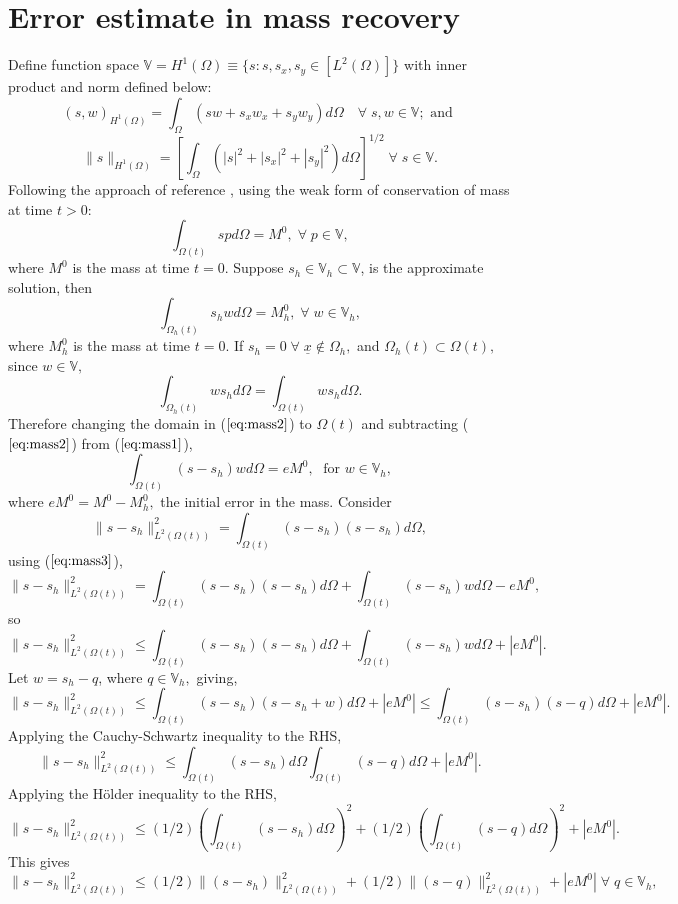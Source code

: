 \documentclass[11pt]{article}
\newcommand{\ul}{\underline}
\newcommand{\bigv}{\mathbb{V}}
\newcommand{\Om}{\Omega}
\begin{document}
\section{Error estimate in mass recovery}
Define function space $ \bigv = H^1(\Om)\equiv\{s: s, s_x, s_y \in [{L}^2(\Omega)]\}$ with inner product and norm defined below:
$$(s,w)_{H^{1}(\Om)} = \int_{\Om}(sw+ s_xw_x + s_yw_y )d\Om\quad \forall \; s, w \in\bigv; \text{ and }$$
$$ \|s\|_{H^1(\Om)} =\left[ \int_{\Om} (|s|^2 + |s_x|^2 +|s_y|^2 )d\Om\right]^{1/2}\; \forall \; s\in\bigv.$$
Following the approach of reference \cite{Baines2011}, using the weak form of conservation of mass at time $t>0$:
\begin{equation}
\label{eq:mass1}
\int_{\Om(t)}spd{\Om} = M^0, \; \forall \;p\in\bigv, 
\end{equation}
where $M^0$ is the mass at time $t=0$.
Suppose $s_h \in\bigv_h \subset \bigv$, is the approximate solution, then
\begin{equation}
\label{eq:mass2}
\int_{\Om_h(t)}s_hwd{\Om} = M_h^0, \; \forall \; w\in\bigv_h, 
\end{equation}
where $M_h^0$ is the mass at time $t=0$.
If $s_h = 0 \; \forall \; \ul{x} \notin \Om_h,$ and $\Om_h(t) \subset \Om(t),$ since $w \in \bigv,$
$$\int_{\Om_h(t)}ws_h d\Om = \int_{\Om(t) }ws_hd\Om.$$
Therefore changing the domain in ($\ref{eq:mass2}$) to $\Om(t) $ and subtracting ($\ref{eq:mass2}$) from ($\ref{eq:mass1}$),
\begin{equation}
\label{eq:mass3}
\int_{\Om(t)}(s-s_h)wd{\Om} = eM^0, \; \text{ for } w\in\bigv_h, 
\end{equation}
where $eM^0 = M^0 - M_h^0,$ the initial error in the mass.
Consider
$$\|s-s_h\|_{L^2(\Om(t))}^2 = \int_{\Om(t)}(s-s_h)(s-s_h)d\Om,$$
using ($\ref{eq:mass3}$),
$$\|s-s_h\|_{L^2(\Om(t))}^2 = \int_{\Om(t)}(s-s_h)(s-s_h)d\Om + \int_{\Om(t)}(s-s_h)wd{\Om} - eM^0,         $$
so
$$\|s-s_h\|_{L^2(\Om(t))}^2 \leq \int_{\Om(t)}(s-s_h)(s-s_h)d\Om + \int_{\Om(t)}(s-s_h)wd{\Om} + |eM^0|.$$
Let $w = s_h - q$, where $q\in\bigv_h,$ giving,
$$\|s-s_h\|_{L^2(\Om(t))}^2 \leq \int_{\Om(t)}(s-s_h)(s-s_h+w)d\Om + |eM^0| \leq \int_{\Om(t)}(s-s_h)(s-q)d\Om +|eM^0| .$$
Applying the Cauchy-Schwartz inequality to the RHS,
$$\|s-s_h\|_{L^2(\Om(t))}^2 \leq \int_{\Om(t)}(s-s_h)d\Om \int_{\Om(t)}(s-q)d\Om + |eM^0|.$$
Applying the H{\"o}lder inequality to the RHS,
$$\|s-s_h\|_{L^2(\Om(t))}^2 \leq (1/2)\left(\int_{\Om(t)}(s-s_h)d\Om\right)^2 + (1/2)\left(\int_{\Om(t)}(s-q)d\Om\right)^2 +|eM^0|.$$
This gives
$$\|s-s_h\|_{L^2(\Om(t))}^2 \leq (1/2)\|(s-s_h)\|_{L^2(\Om(t))}^2 + (1/2)\|(s-q)\|_{L^2(\Om(t))}^2  +|eM^0| \;\forall\;q\in\bigv_h,$$
\end{document}
